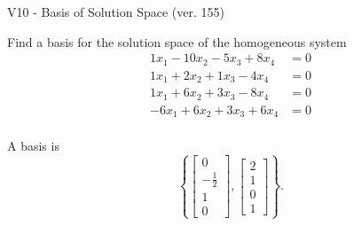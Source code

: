 \begin{exercise}
  \begin{exerciseTitle}V10 - Basis of Solution Space (ver. 155)\end{exerciseTitle}
  \begin{exerciseStatement}
    Find a basis for the solution space of the homogeneous system 
\begin{align*}
 1 x_ 1 -10 x_ 2 -5 x_ 3 + 8 x_ 4 &= 0  \\ 
  1 x_ 1 + 2 x_ 2 + 1 x_ 3 -4 x_ 4 &= 0  \\ 
  1 x_ 1 + 6 x_ 2 + 3 x_ 3 -8 x_ 4 &= 0  \\ 
  -6 x_ 1 + 6 x_ 2 + 3 x_ 3 + 6 x_ 4 &= 0  \\ 
 \end{align*}


 
  \end{exerciseStatement}

  \begin{exerciseAnswer}
   A basis is   
\[\left\{\left[\begin{array}{c}
0 \\
-\frac{1}{2} \\
1 \\
0
\end{array}\right] , \left[\begin{array}{c}
2 \\
1 \\
0 \\
1
\end{array}\right]\right\}.\]

  


  \end{exerciseAnswer}
\end{exercise}